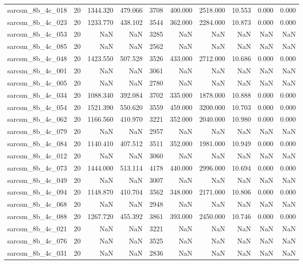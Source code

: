 \begin{tabular}{lrrrrrrrrr}
sarcsm\_8b\_4c\_018 & 20 & 1344.320 & 479.066 & 3708 & 400.000 & 2518.000 & 10.553 & 0.000 & 0.000 \\
sarcsm\_8b\_4c\_023 & 20 & 1233.770 & 438.102 & 3544 & 362.000 & 2284.000 & 10.873 & 0.000 & 0.000 \\
sarcsm\_8b\_4c\_053 & 20 & NaN & NaN & 3285 & NaN & NaN & NaN & NaN & NaN \\
sarcsm\_8b\_4c\_085 & 20 & NaN & NaN & 2562 & NaN & NaN & NaN & NaN & NaN \\
sarcsm\_8b\_4c\_048 & 20 & 1423.550 & 507.528 & 3526 & 433.000 & 2712.000 & 10.686 & 0.000 & 0.000 \\
sarcsm\_8b\_4c\_001 & 20 & NaN & NaN & 3061 & NaN & NaN & NaN & NaN & NaN \\
sarcsm\_8b\_4c\_005 & 20 & NaN & NaN & 2780 & NaN & NaN & NaN & NaN & NaN \\
sarcsm\_8b\_4c\_034 & 20 & 1088.340 & 392.084 & 3702 & 335.000 & 1878.000 & 10.888 & 0.000 & 0.000 \\
sarcsm\_8b\_4c\_054 & 20 & 1521.390 & 550.620 & 3559 & 459.000 & 3200.000 & 10.703 & 0.000 & 0.000 \\
sarcsm\_8b\_4c\_062 & 20 & 1166.560 & 410.970 & 3221 & 352.000 & 2040.000 & 10.980 & 0.000 & 0.000 \\
sarcsm\_8b\_4c\_079 & 20 & NaN & NaN & 2957 & NaN & NaN & NaN & NaN & NaN \\
sarcsm\_8b\_4c\_084 & 20 & 1140.410 & 407.512 & 3511 & 352.000 & 1981.000 & 10.949 & 0.000 & 0.000 \\
sarcsm\_8b\_4c\_012 & 20 & NaN & NaN & 3060 & NaN & NaN & NaN & NaN & NaN \\
sarcsm\_8b\_4c\_073 & 20 & 1444.000 & 513.114 & 4178 & 440.000 & 2996.000 & 10.694 & 0.000 & 0.000 \\
sarcsm\_8b\_4c\_049 & 20 & NaN & NaN & 3007 & NaN & NaN & NaN & NaN & NaN \\
sarcsm\_8b\_4c\_094 & 20 & 1148.870 & 410.704 & 3562 & 348.000 & 2171.000 & 10.806 & 0.000 & 0.000 \\
sarcsm\_8b\_4c\_068 & 20 & NaN & NaN & 2948 & NaN & NaN & NaN & NaN & NaN \\
sarcsm\_8b\_4c\_088 & 20 & 1267.720 & 455.392 & 3861 & 393.000 & 2450.000 & 10.746 & 0.000 & 0.000 \\
sarcsm\_8b\_4c\_021 & 20 & NaN & NaN & 3221 & NaN & NaN & NaN & NaN & NaN \\
sarcsm\_8b\_4c\_076 & 20 & NaN & NaN & 3525 & NaN & NaN & NaN & NaN & NaN \\
sarcsm\_8b\_4c\_031 & 20 & NaN & NaN & 2836 & NaN & NaN & NaN & NaN & NaN \\

\end{tabular}
